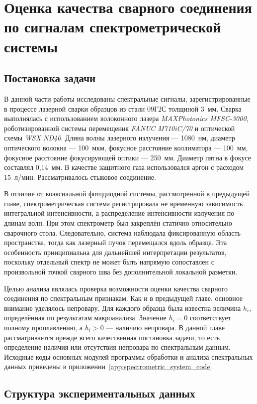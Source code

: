 \chapter{Оценка качества сварного соединения по сигналам спектрометрической системы}

\section{Постановка задачи}

В данной части работы исследованы спектральные сигналы, зарегистрированные в процессе лазерной сварки образцов из стали 09Г2С толщиной 3~мм. Сварка выполнялась с использованием волоконного лазера \textit{MAXPhotonics MFSC-3000}, роботизированной системы перемещения \textit{FANUC M710iC/70} и оптической схемы \textit{WSX ND40}. Длина волны лазерного излучения --- 1080~нм, диаметр оптического волокна --- 100~мкм, фокусное расстояние коллиматора --- 100~мм, фокусное расстояние фокусирующей оптики --- 250~мм. Диаметр пятна в фокусе составлял 0,14~мм. В качестве защитного газа использовался аргон с расходом 15~л/мин. Рассматривалось стыковое соединение.

В отличие от коаксиальной фотодиодной системы, рассмотренной в предыдущей главе, спектрометрическая система регистрировала не временную зависимость интегральной интенсивности, а распределение интенсивности излучения по длинам волн. При этом спектрометр был закреплён статично относительно сварочного стола. Следовательно, система наблюдала фиксированную область пространства, тогда как лазерный пучок перемещался вдоль образца. Эта особенность принципиальна для дальнейшей интерпретации результатов, поскольку отдельный спектр не может быть напрямую сопоставлен с произвольной точкой сварного шва без дополнительной локальной разметки.

Целью анализа являлась проверка возможности оценки качества сварного соединения по спектральным признакам. Как и в предыдущей главе, основное внимание уделялось непровару. Для каждого образца была известна величина \(h_i\), определённая по результатам макроанализа. Значение \(h_i = 0\) соответствует полному проплавлению, а \(h_i > 0\) --- наличию непровара. В данной главе рассматривается прежде всего качественная постановка задачи, то есть определение наличия или отсутствия непровара по спектральным данным. Исходные коды основных модулей программы обработки и анализа спектральных данных приведены в приложении~\ref{app:spectrometric_system_code}.

\section{Структура экспериментальных данных}

